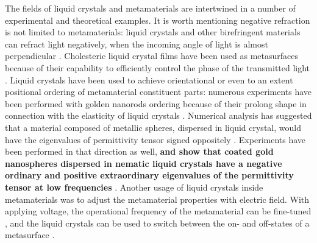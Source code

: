 \documentclass[a4paper,11pt]{article}
\begin{document}
The fields of liquid crystals and metamaterials are intertwined in a number of experimental and theoretical examples. 
It is worth mentioning negative refraction is not limited to metamaterials: liquid crystals and other birefringent materials can refract light negatively, when the incoming angle of light is almost perpendicular \cite{lavrentovich-2006-lc-neg}.
Cholesteric liquid crystal films have been used as metasurfaces because of their capability to efficiently control the phase of the transmitted light \cite{ozaki-2016-patterned-lc}.
Liquid crystals have been used to achieve orientational or even to an extent positional ordering of metamaterial constituent parts: numerous experiments have been performed with golden nanorods ordering because of their prolong shape in connection with the elasticity of liquid crystals \cite{lavrentovich-2008-gold-nanorods,smalyukh-2010-self-alignment,lavrentovich-2009-nanorods}. 
Numerical analysis has suggested that a material composed of metallic spheres, dispersed in liquid crystal, would have the eigenvalues of permittivity tensor signed oppositely \cite{xuan-2013-nanoparticle-lc,khoo-2014-nanoparticle-lc}. 
Experiments have been performed in that direction as well, \textbf{and show that coated gold nanospheres dispersed in nematic liquid crystals have a negative ordinary and positive extraordinary eigenvalues of the permittivity tensor at low frequencies} \cite{goodby-2011-lc-gold-mtm}. 
Another usage of liquid crystals inside metamaterials was to adjust the metamaterial properties with electric field. 
With applying voltage, the operational frequency of the metamaterial can be fine-tuned \cite{zhang-2007-lc-mtm-tuning,shalaev-2007-tunable-lc}, and the liquid crystals can be used to switch between the on- and off-states of a metasurface \cite{buchnev-2015-lc-mtm-switch}. 
\end{document}
